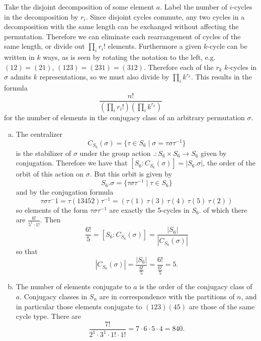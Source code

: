 \documentclass{article}
\begin{document}
\begin{Answer}
Take the disjoint decomposition of some element $a$.
Label the number of $i$-cycles in the decomposition by $r_i$.
 Since disjoint cycles commute, any two cycles in a decomposition
with the same length can be exchanged without affecting the
permutation. Therefore we can eliminate each rearrangement of
cycles of the same length, or divide out $\prod_{i} r_i!$ elements.
Furthermore a given $k$-cycle can be written in $k$ ways, as is seen
by rotating the notation to the left, e.g.
$(12) = (21)$, $(123) = (231) = (312)$. Therefore each of the
$r_k$ $k$-cycles in $\sigma$ admits $k$ representations, so we must
also divide by $\prod_i k^{r_k}$. This results in the formula
$$
\frac{n!}{\left(\prod_{i} r_i!\right) \left(\prod_i k^{r_k}\right)}
$$
for the number of elements in the conjugacy class of an arbitrary
permutation $\sigma$.

\begin{enumerate}[(a)]
  \item{
    The centralizer
    $$
    C_{S_6}(\sigma) =
    \{ \tau \in S_6
       \mid \sigma = \tau \sigma \tau^{-1}
    \}
    $$
    is the stabilizer of $\sigma$ under the group action
    $. : S_6 \times S_6 \to S_6$ given by conjugation. Therefore we have
    that $[S_6 : C_{S_6}(\sigma)] = |S_6 . \sigma|$, the order of the orbit of this
    action on $\sigma$. But this orbit is given by
    $$
    S_6 . \sigma =
    \{ \tau \sigma \tau^{-1} \mid \tau \in S_6 \}
    $$
    and by the conjugation formula
    $$
    \tau \sigma \tau^-1
    = \tau (13452) \tau^{-1}
    = (\tau(1) ~ \tau(3) ~ \tau(4) ~ \tau(5) ~ \tau(2))
    $$
    so elements of the form $\tau \sigma \tau^{-1}$ are exactly the
    5-cycles in $S_6$. of which there are $\frac{6!}{5^1 \cdot 1!}$. Then
    $$
    \frac{6!}{5} = [S_6 : C_{S_6}(\sigma)] = \frac{|S_6|}{|C_{S_6}(\sigma)|}
    $$
    so that
    $$
    |C_{S_6}(\sigma)| = \frac{|S_6|}{\frac{6!}{5}}
                     = \frac{6!}{\frac{6!}{5}}
                     = 5.
    $$
  }
  \item{
    The number of elements conjugate to $a$ is the order of the
    conjugacy class of $a$. Conjugacy classes in $S_n$ are in
    correspondence with the partitions of $n$, and in particular those
    elements conjugate to $(123)(45)$ are those of the same cycle type.
    There are
    $$
    \frac{7!}{2^1 \cdot 3^1 \cdot 1! \cdot 1!} =
    7 \cdot 6 \cdot 5 \cdot 4 = 840.
    $$
  }
\end{enumerate}
\end{Answer}

\pagebreak
\end{document}
